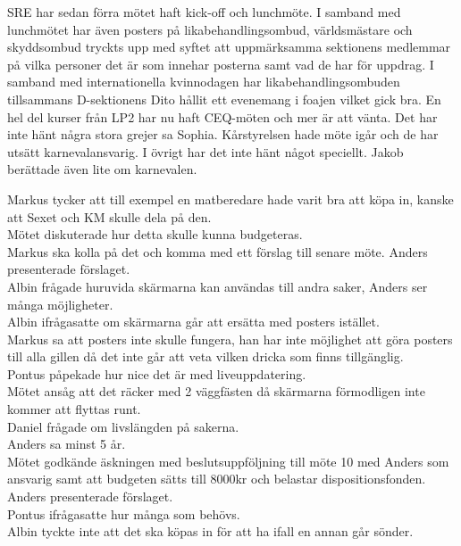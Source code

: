 \documentclass[10pt]{article}
\begin{document}
\begin{paragrafer}
\begin{paragrafer}
SRE har sedan förra mötet haft kick-off och lunchmöte. I samband med lunchmötet har även posters på likabehandlingsombud, världsmästare och skyddsombud tryckts upp med syftet att uppmärksamma sektionens medlemmar på vilka personer det är som innehar posterna samt vad de har för uppdrag. I samband med internationella kvinnodagen har likabehandlingsombuden tillsammans D-sektionens Dito hållit ett evenemang i foajen vilket gick bra. En hel del kurser från LP2 har nu haft CEQ-möten och mer är att vänta.
Det har inte hänt några stora grejer sa Sophia.
Kårstyrelsen hade möte igår och de har utsätt karnevalansvarig. I övrigt har det inte hänt något speciellt. Jakob berättade även lite om karnevalen.
\end{paragrafer}
Markus tycker att till exempel en matberedare hade varit bra att köpa in, kanske att Sexet och KM skulle dela på den.\\
Mötet diskuterade hur detta skulle kunna budgeteras.\\
Markus ska kolla på det och komma med ett förslag till senare möte.
Anders presenterade förslaget.\\
Albin frågade huruvida skärmarna kan användas till andra saker, Anders ser många möjligheter.\\
Albin ifrågasatte om skärmarna går att ersätta med posters istället.\\
Markus sa att posters inte skulle fungera, han har inte möjlighet att göra posters till alla gillen då det inte går att veta vilken dricka som finns tillgänglig.\\
Pontus påpekade hur nice det är med liveuppdatering.\\
Mötet ansåg att det räcker med 2 väggfästen då skärmarna förmodligen inte kommer att flyttas runt.\\
Daniel frågade om livslängden på sakerna.\\
Anders sa minst 5 år.\\
Mötet godkände äskningen med beslutsuppföljning till möte 10 med Anders som ansvarig samt att budgeten sätts till 8000kr och belastar dispositionsfonden.
Anders presenterade förslaget.\\
Pontus ifrågasatte hur många som behövs.\\
Albin tyckte inte att det ska köpas in för att ha ifall en annan går sönder.\\

\end{paragrafer}
\end{document}
